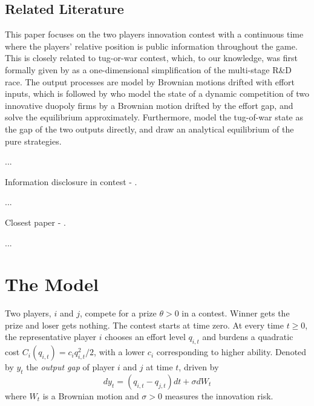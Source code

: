 \documentclass[mnsc]{informs3}
\begin{document}
\subsection{Related Literature}

This paper focuses on the two players innovation contest with a continuous time  where the players’ relative position is public information throughout the game.
This is closely related to tug-or-war contest, which, to our knowledge, was first formally given by \citet{Harris1987Race} as a one-dimensional simplification of the multi-stage R\&D race. 
The output processes are model by Brownian motions drifted with effort inputs, which is followed by \cite{budd1993model} who model the state of a dynamic competition of two innovative duopoly firms by a Brownian motion drifted by the effort gap, and solve the equilibrium approximately. 
Furthermore, \citet{Moscarini2011Contest} model the tug-of-war state as the gap of the two outputs directly, and draw an analytical equilibrium of the pure strategies. 

...

Information disclosure in contest - \cite{Bimpikis2019Contest}. 

...

Closest paper - \cite{ryvkin2022fight}.

...




\section{The Model}

Two players, $i$ and $j$, compete for a prize $\theta>0$ in a contest. 
Winner gets the prize and loser gets nothing. 
The contest starts at time zero. 
At every time $t\ge0$, the representative player $i$ chooses an effort level $q_{i,t}$ and burdens a quadratic cost $C_i(q_{i,t}) = c_i q_{i,t}^2/2$, with a lower $c_i$ corresponding to higher ability. 
Denoted by $y_t$ the \textit{output gap} of player $i$ and $j$ at time $t$, driven by
\begin{equation}\label{eq-state-dynamics}
	dy_t = (q_{i,t}-q_{j,t})dt + \sigma dW_t
\end{equation}
where $W_t$ is a Brownian motion and $\sigma>0$ measures the innovation risk.
\end{document}
